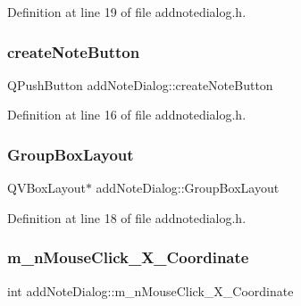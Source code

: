 Definition at line 19 of file addnotedialog.\+h.

\hypertarget{classaddNoteDialog_ae424f90e2d41fa5ec323d4c93a91f527}{}\label{classaddNoteDialog_ae424f90e2d41fa5ec323d4c93a91f527} 
\subsubsection{\texorpdfstring{create\+Note\+Button}{createNoteButton}}
{\footnotesize\ttfamily Q\+Push\+Button add\+Note\+Dialog\+::create\+Note\+Button}



Definition at line 16 of file addnotedialog.\+h.

\hypertarget{classaddNoteDialog_aec3ffbbf5c9ceebc839678cb1c842499}{}\label{classaddNoteDialog_aec3ffbbf5c9ceebc839678cb1c842499} 
\subsubsection{\texorpdfstring{Group\+Box\+Layout}{GroupBoxLayout}}
{\footnotesize\ttfamily Q\+V\+Box\+Layout$\ast$ add\+Note\+Dialog\+::\+Group\+Box\+Layout}



Definition at line 18 of file addnotedialog.\+h.

\hypertarget{classaddNoteDialog_af54413cf6c84a6610266d9c616f44541}{}\label{classaddNoteDialog_af54413cf6c84a6610266d9c616f44541} 
\subsubsection{\texorpdfstring{m\+\_\+n\+Mouse\+Click\+\_\+\+X\+\_\+\+Coordinate}{m\_nMouseClick\_X\_Coordinate}}
{\footnotesize\ttfamily int add\+Note\+Dialog\+::m\+\_\+n\+Mouse\+Click\+\_\+\+X\+\_\+\+Coordinate\hspace{0.3cm}{\ttfamily [private]}}




